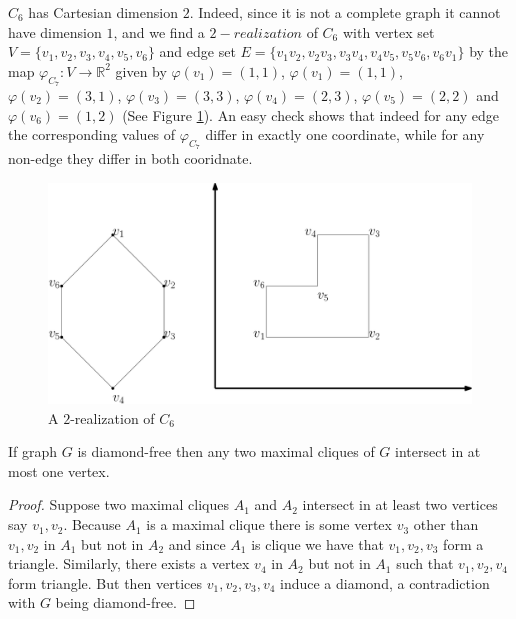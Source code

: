 \documentclass[12pt,a4paper,titlepage,openany]{report}
\begin{document}
\begin{example}
$C_6$ has Cartesian dimension $2$. Indeed, since it is not a complete graph it cannot have dimension $1$, and we find a $2-realization$ of $C_6$ with vertex set $V=\{v_1,v_2,v_3,v_4,v_5,v_6\}$ and edge set $E=\{v_1v_2,v_2v_3,v_3v_4,v_4v_5,v_5v_6,v_6v_1\}$ by the map $\varphi_{C_7}:V\to \mathbb{R}^2$ given by $\varphi(v_1)=(1,1)$, $\varphi(v_1)=(1,1)$, $\varphi(v_2)=(3,1)$, $\varphi(v_3)=(3,3)$, $\varphi(v_4)=(2,3)$, $\varphi(v_5)=(2,2)$ and $\varphi(v_6)=(1,2)$ (See Figure \ref{c_62real}). An easy check shows that indeed for any edge the corresponding values of $\varphi_{C_7}$ differ in exactly one coordinate, while for any non-edge they differ in both cooridnate.
\begin{figure}[h]
\begin{center}
\includegraphics[width=1\linewidth]{figures/c_62real.png}
\end{center}
\caption{A $2$-realization of $C_6$}\label{c_62real}
\end{figure}
\end{example} 

\begin{lemma}\label{diamondfreecliques}
If graph $G$ is diamond-free then any two maximal cliques of $G$ intersect in at most one vertex.
\end{lemma}
\begin{proof}
Suppose two maximal cliques $A_1$ and $A_2$ intersect in at least two vertices say $v_1, v_2$. Because $A_1$ is a maximal clique there is some vertex $v_3$ other than $v_1,v_2$ in $A_1$ but not in $A_2$ and since $A_1$ is clique we have that $v_1,v_2,v_3$ form a triangle. Similarly, there exists a vertex $v_4$ in $A_2$ but not in $A_1$ such that $v_1,v_2,v_4$ form triangle. But then vertices $v_1,v_2,v_3,v_4$ induce a diamond, a contradiction with $G$ being diamond-free.
\end{proof}
\end{document}
